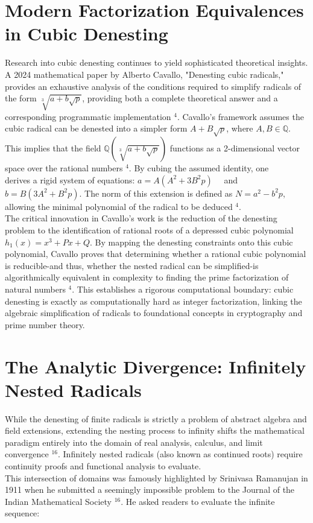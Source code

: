 \documentclass[10pt]{article}
\begin{document}
\section*{Modern Factorization Equivalences in Cubic Denesting}
Research into cubic denesting continues to yield sophisticated theoretical insights. A 2024 mathematical paper by Alberto Cavallo, "Denesting cubic radicals," provides an exhaustive analysis of the conditions required to simplify radicals of the form $\sqrt[3]{a+b \sqrt{p}}$, providing both a complete theoretical answer and a corresponding programmatic implementation ${ }^{4}$. Cavallo's framework assumes the cubic radical can be denested into a simpler form $A+B \sqrt{p}$, where $A, B \in \mathbb{Q}$. This implies that the field $\mathbb{Q}(\sqrt[3]{a+b \sqrt{p}})$ functions as a 2-dimensional vector space over the rational numbers ${ }^{4}$. By cubing the assumed identity, one\\
derives a rigid system of equations: $a=A\left(A^{2}+3 B^{2} p\right) \quad$ and $b=B\left(3 A^{2}+B^{2} p\right)$. The norm of this extension is defined as $N=a^{2}-b^{2} p$, allowing the minimal polynomial of the radical to be deduced ${ }^{4}$.\\
The critical innovation in Cavallo's work is the reduction of the denesting problem to the identification of rational roots of a depressed cubic polynomial $h_{1}(x)=x^{3}+P x+Q$. By mapping the denesting constraints onto this cubic polynomial, Cavallo proves that determining whether a rational cubic polynomial is reducible-and thus, whether the nested radical can be simplified-is algorithmically equivalent in complexity to finding the prime factorization of natural numbers ${ }^{4}$. This establishes a rigorous computational boundary: cubic denesting is exactly as computationally hard as integer factorization, linking the algebraic simplification of radicals to foundational concepts in cryptography and prime number theory.

\section*{The Analytic Divergence: Infinitely Nested Radicals}
While the denesting of finite radicals is strictly a problem of abstract algebra and field extensions, extending the nesting process to infinity shifts the mathematical paradigm entirely into the domain of real analysis, calculus, and limit convergence ${ }^{16}$. Infinitely nested radicals (also known as continued roots) require continuity proofs and functional analysis to evaluate.\\
This intersection of domains was famously highlighted by Srinivasa Ramanujan in 1911 when he submitted a seemingly impossible problem to the Journal of the Indian Mathematical Society ${ }^{16}$. He asked readers to evaluate the infinite sequence:
\end{document}
